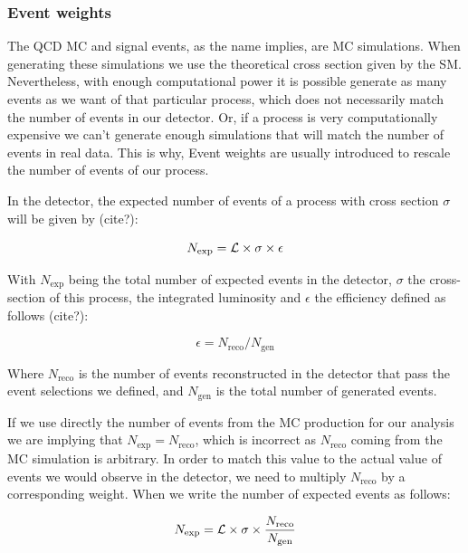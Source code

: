 \subsubsection{Event weights}

The QCD MC and signal events, as the name implies, are MC simulations. When generating these simulations we use the theoretical cross section given by the SM. Nevertheless, with enough computational power it is possible generate as many events as we want of that particular process, which does not necessarily match the number of events in our detector.
Or, if a process is very computationally expensive we can't generate enough simulations that will match the number of events in real data. This is why,  Event weights are usually introduced to rescale the number of events of our process.

In the detector, the expected number of events of a process with cross section $\sigma$ will be given by (cite?):

\begin{equation*}
    N_{\text{exp}} = {\mathcal{L}} \times \sigma \times \epsilon
\end{equation*}

\noindent With $N_{\text{exp}}$ being the total number of expected events in the detector, $\sigma$ the cross-section of this process, \lumi the integrated luminosity and $\epsilon$ the efficiency defined as follows (cite?):


\begin{equation*}
    \epsilon= N_{\text{reco}} / N_{\text{gen}}
\end{equation*}

\noindent Where $N_{\text{reco}}$ is the number of events reconstructed in the detector that pass the event selections we defined, and $N_{\text{gen}}$ is the total number of generated events.

If we use directly the number of events from the MC production for our analysis we are implying that $N_{\text{exp}}=N_{\text{reco}}$, which is incorrect as $N_{\text{reco}}$ coming from the MC simulation is arbitrary. In order to match this value to the actual value of events we would observe in the detector, we need to multiply $N_{\text{reco}}$ by a corresponding weight. When we write the number of expected events as follows:

\begin{equation*}
    N_{\text{exp}} = {\mathcal{L}} \times \sigma \times \frac{N_{\text{reco}}}{N_{\text{gen}}}
\end{equation*}

